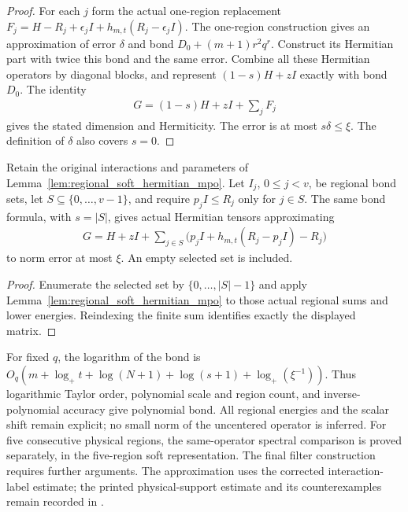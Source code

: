 \begin{proof}\leanok
    For each $j$ form the actual one-region replacement
    $F_j=H-R_j+\epsilon_jI+h_{m,t}(R_j-\epsilon_jI)$.
    The one-region construction gives an approximation of error $\delta$
    and bond $D_0+(m+1)r^2q^r$. Construct its Hermitian part with twice
    this bond and the same error. Combine all these Hermitian operators
    by diagonal blocks, and represent $(1-s)H+zI$ exactly with bond $D_0$.
    The identity
    \begin{align}
        G=(1-s)H+zI+\sum_j F_j
    \end{align}
    gives the stated dimension and Hermiticity. The error is at most
    $s\delta\leq\xi$. The definition of $\delta$ also covers $s=0$.
\end{proof}


\begin{lemma}
    \label{lem:selected_regional_soft_mpo}
    \leanok
    Retain the original interactions and parameters of
    Lemma~\ref{lem:regional_soft_hermitian_mpo}. Let $I_j$, $0\leq j<v$,
    be regional bond sets, let $S\subseteq\{0,\ldots,v-1\}$, and require
    $p_jI\leq R_j$ only for $j\in S$. The same bond formula, with
    $s=|S|$, gives actual Hermitian tensors approximating
    \begin{align}
        G=H+zI+\sum_{j\in S}
        \bigl(p_jI+h_{m,t}(R_j-p_jI)-R_j\bigr)
    \end{align}
    to norm error at most $\xi$. An empty selected set is included.
\end{lemma}
\begin{proof}\leanok
    Enumerate the selected set by $\{0,\ldots,|S|-1\}$ and apply
    Lemma~\ref{lem:regional_soft_hermitian_mpo} to those actual
    regional sums and lower energies. Reindexing the finite sum
    identifies exactly the displayed matrix.
\end{proof}

For fixed $q$, the logarithm of the bond is
$O_q(m+\log_+t+\log(N+1)+\log(s+1)+\log_+(\xi^{-1}))$.
Thus logarithmic Taylor order, polynomial scale and region count, and
inverse-polynomial accuracy give polynomial bond. All regional energies
and the scalar shift remain explicit; no small norm of the uncentered
operator is inferred. For five consecutive physical regions, the
same-operator spectral comparison is proved separately, in the
five-region soft representation. The final filter
construction requires further arguments. The approximation uses the
corrected interaction-label estimate; the printed physical-support
estimate and its counterexamples remain recorded in
\cite{gap:alvv16_cluster_approximation}.
